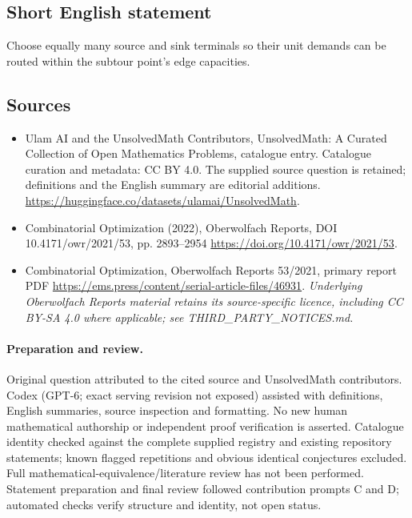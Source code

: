 \documentclass[11pt]{article}
\begin{document}
\subsection{Short English statement}
Choose equally many source and sink terminals so their unit demands can be routed within the subtour point's edge capacities.
\subsection{Sources}
\begin{itemize}
\item[\hypertarget{source:statement:1}{S1}] Ulam AI and the UnsolvedMath Contributors, UnsolvedMath: A Curated Collection of Open Mathematics Problems, catalogue entry. Catalogue curation and metadata: CC BY 4.0. The supplied source question is retained; definitions and the English summary are editorial additions.
\url{https://huggingface.co/datasets/ulamai/UnsolvedMath}.
\item[\hypertarget{source:statement:2}{S2}] Combinatorial Optimization (2022), Oberwolfach Reports, DOI 10.4171/owr/2021/53, pp. 2893--2954
\url{https://doi.org/10.4171/owr/2021/53}.
\item[\hypertarget{source:statement:3}{S3}] Combinatorial Optimization, Oberwolfach Reports 53/2021, primary report PDF
\url{https://ems.press/content/serial-article-files/46931}.
\textit{Underlying Oberwolfach Reports material retains its source-specific licence, including CC BY-SA 4.0 where applicable; see THIRD\_PARTY\_NOTICES.md.}
\end{itemize}
\paragraph{Preparation and review.}
Original question attributed to the cited source and UnsolvedMath contributors. Codex (GPT-6; exact serving revision not exposed) assisted with definitions, English summaries, source inspection and formatting. No new human mathematical authorship or independent proof verification is asserted. Catalogue identity checked against the complete supplied registry and existing repository statements; known flagged repetitions and obvious identical conjectures excluded. Full mathematical-equivalence/literature review has not been performed. Statement preparation and final review followed contribution prompts C and D; automated checks verify structure and identity, not open status.
\label{end:statement}
\end{document}
